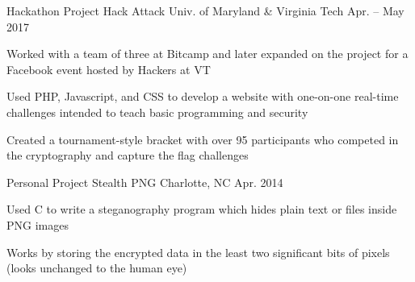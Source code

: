 

\begin{cventries}

  \cventry
    {Hackathon Project} %
    {Hack Attack} %
    {Univ. of Maryland \& Virginia Tech} %
    {Apr. – May 2017} %
    {
      \begin{cvitems} %
      \item {Worked with a team of three at Bitcamp and later expanded on the project for a Facebook event hosted by Hackers at VT}
      \item {Used PHP, Javascript, and CSS to develop a website with one-on-one real-time challenges intended to teach basic programming and security}
      \item {Created a tournament-style bracket with over 95 participants who competed in the cryptography and capture the flag challenges}
      \end{cvitems}
    }

  \cventry
    {Personal Project} %
    {Stealth PNG} %
    {Charlotte, NC} %
    {Apr. 2014} %
    {
      \begin{cvitems} %
      \item {Used C to write a steganography program which hides plain text or files inside PNG images}
      \item {Works by storing the encrypted data in the least two significant bits of pixels (looks unchanged to the human eye)}
      \end{cvitems}
    }

\end{cventries}
